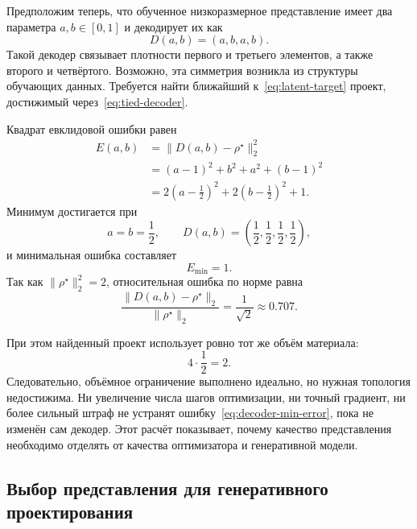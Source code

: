 Предположим теперь, что обученное низкоразмерное представление имеет два параметра $a,b\in[0,1]$ и декодирует их как
\begin{equation}
\label{eq:tied-decoder}
 D(a,b)=(a,b,a,b).
\end{equation}
Такой декодер связывает плотности первого и третьего элементов, а также второго и четвёртого. Возможно, эта симметрия возникла из структуры обучающих данных. Требуется найти ближайший к~\eqref{eq:latent-target} проект, достижимый через~\eqref{eq:tied-decoder}.

Квадрат евклидовой ошибки равен
\begin{equation}
 \begin{aligned}
 E(a,b)
 &=\|D(a,b)-\rho^\star\|_2^2\\
 &=(a-1)^2+b^2+a^2+(b-1)^2\\
 &=2\left(a-\frac12\right)^2
   +2\left(b-\frac12\right)^2
   +1.
 \end{aligned}
\end{equation}
Минимум достигается при
\begin{equation}
 a=b=\frac12,
 \qquad
 D(a,b)=\left(\frac12,\frac12,\frac12,\frac12\right),
\end{equation}
и минимальная ошибка составляет
\begin{equation}
\label{eq:decoder-min-error}
 E_{\min}=1.
\end{equation}
Так как $\|\rho^\star\|_2^2=2$, относительная ошибка по норме равна
\begin{equation}
 \frac{\|D(a,b)-\rho^\star\|_2}
      {\|\rho^\star\|_2}
 =
 \frac{1}{\sqrt2}
 \approx0.707.
\end{equation}

При этом найденный проект использует ровно тот же объём материала:
\begin{equation}
 4\cdot\frac12=2.
\end{equation}
Следовательно, объёмное ограничение выполнено идеально, но нужная топология недостижима. Ни увеличение числа шагов оптимизации, ни точный градиент, ни более сильный штраф не устранят ошибку~\eqref{eq:decoder-min-error}, пока не изменён сам декодер. Этот расчёт показывает, почему качество представления необходимо отделять от качества оптимизатора и генеративной модели.

\subsection{Выбор представления для генеративного проектирования}

